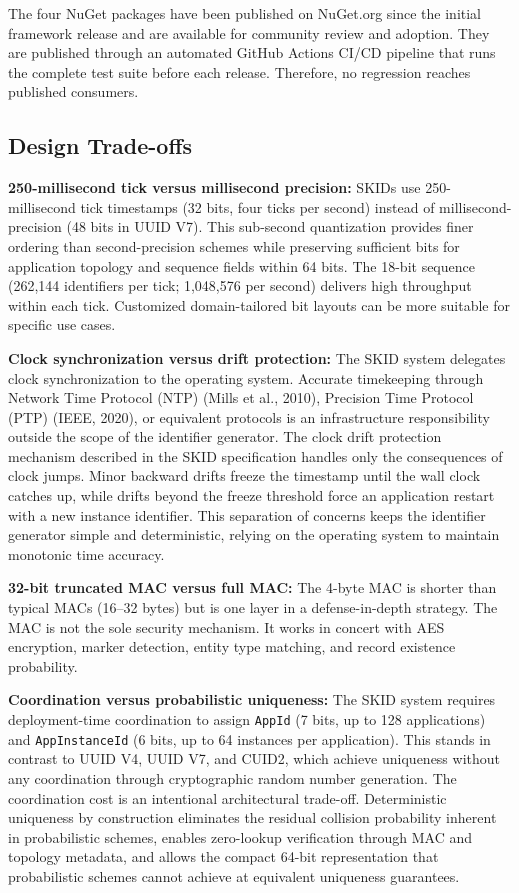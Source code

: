 \documentclass[fleqn,10pt,lineno]{wlpeerj}
\begin{document}
The four NuGet packages have been published on NuGet.org since the
initial framework release and are available for community review and
adoption. They are published through an automated GitHub Actions CI/CD
pipeline that runs the complete test suite before each release.
Therefore, no regression reaches published consumers.

\subsection{Design Trade-offs}\label{design-trade-offs}

\textbf{250-millisecond tick versus millisecond precision:} SKIDs use
250-millisecond tick timestamps (32 bits, four ticks per second) instead
of millisecond-precision (48 bits in UUID V7). This sub-second
quantization provides finer ordering than second-precision schemes while
preserving sufficient bits for application topology and sequence fields
within 64 bits. The 18-bit sequence (262,144 identifiers per tick;
1,048,576 per second) delivers high throughput within each tick.
Customized domain-tailored bit layouts can be more suitable for specific
use cases.

\textbf{Clock synchronization versus drift protection:} The SKID system
delegates clock synchronization to the operating system. Accurate
timekeeping through Network Time Protocol (NTP) (Mills et al., 2010),
Precision Time Protocol (PTP) (IEEE, 2020), or equivalent protocols is
an infrastructure responsibility outside the scope of the identifier
generator. The clock drift protection mechanism described in the SKID
specification handles only the consequences of clock jumps. Minor
backward drifts freeze the timestamp until the wall clock catches up,
while drifts beyond the freeze threshold force an application restart
with a new instance identifier. This separation of concerns keeps the
identifier generator simple and deterministic, relying on the operating
system to maintain monotonic time accuracy.

\textbf{32-bit truncated MAC versus full MAC:} The 4-byte MAC is shorter
than typical MACs (16--32 bytes) but is one layer in a defense-in-depth
strategy. The MAC is not the sole security mechanism. It works in
concert with AES encryption, marker detection, entity type matching, and
record existence probability.

\textbf{Coordination versus probabilistic uniqueness:} The SKID system
requires deployment-time coordination to assign \texttt{AppId} (7 bits,
up to 128 applications) and \texttt{AppInstanceId} (6 bits, up to 64
instances per application). This stands in contrast to UUID V4, UUID V7,
and CUID2, which achieve uniqueness without any coordination through
cryptographic random number generation. The coordination cost is an
intentional architectural trade-off. Deterministic uniqueness by
construction eliminates the residual collision probability inherent in
probabilistic schemes, enables zero-lookup verification through MAC and
topology metadata, and allows the compact 64-bit representation that
probabilistic schemes cannot achieve at equivalent uniqueness
guarantees.
\end{document}
